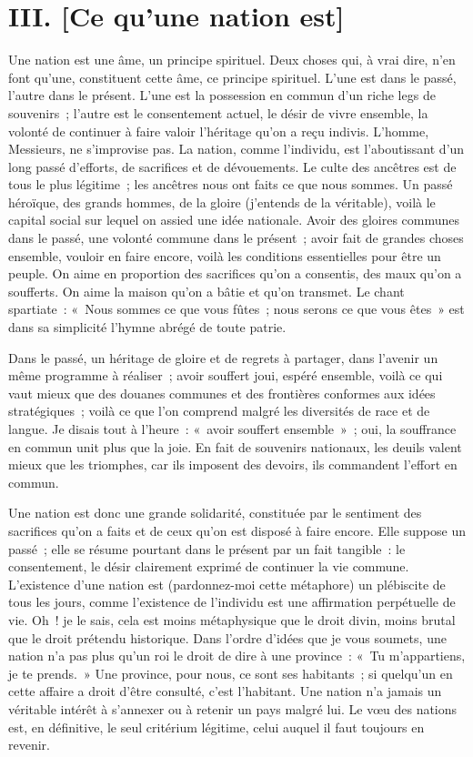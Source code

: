 \documentclass[french,twoside]{book} %
\newcommand\chaptercont{} %
\begin{document}
\chapter[{III. [Ce qu’une nation est]}]{III. [Ce qu’une nation est]}
\renewcommand{\leftmark}{III. [Ce qu’une nation est]}


\chaptercont
\noindent Une nation est une âme, un principe spirituel. Deux choses qui, à vrai dire, n’en font qu’une, constituent cette âme, ce principe spirituel. L’une est dans le passé, l’autre dans le présent. L’une est la possession en commun d’un riche legs de souvenirs ; l’autre est le consentement actuel, le désir de vivre ensemble, la volonté de continuer à faire valoir l’héritage qu’on a reçu indivis. L’homme, Messieurs, ne s’improvise pas. La nation, comme l’individu, est l’aboutissant d’un long passé d’efforts, de sacrifices et de dévouements. Le culte des ancêtres est de tous le plus légitime ; les ancêtres nous ont faits ce que nous sommes. Un passé héroïque, des grands hommes, de la gloire (j’entends de la véritable), voilà le capital social sur lequel on assied une idée nationale. Avoir des gloires communes dans le passé, une volonté commune dans le présent ; avoir fait de grandes choses ensemble, vouloir en faire encore, voilà les conditions essentielles pour être un peuple. On aime en proportion des sacrifices qu’on a consentis, des maux qu’on a soufferts. On aime la maison qu’on a bâtie et qu’on transmet. Le chant spartiate : « Nous sommes ce que vous fûtes ; nous serons ce que vous êtes » est dans sa simplicité l’hymne abrégé de toute patrie.\par
Dans le passé, un héritage de gloire et de regrets à partager, dans l’avenir un même programme à réaliser ; avoir souffert joui, espéré ensemble, voilà ce qui vaut mieux que des douanes communes et des frontières conformes aux idées stratégiques ; voilà ce que l’on comprend malgré les diversités de race et de langue. Je disais tout à l’heure : « avoir souffert ensemble » ; oui, la souffrance en commun unit plus que la joie. En fait de souvenirs nationaux, les deuils valent mieux que les triomphes, car ils imposent des devoirs, ils commandent l’effort en commun.\par
Une nation est donc une grande solidarité, constituée par le sentiment des sacrifices qu’on a faits et de ceux qu’on est disposé à faire encore. Elle suppose un passé ; elle se résume pourtant dans le présent par un fait tangible : le consentement, le désir clairement exprimé de continuer la vie commune. L’existence d’une nation est (pardonnez-moi cette métaphore) un plébiscite de tous les jours, comme l’existence de l’individu est une affirmation perpétuelle de vie. Oh ! je le sais, cela est moins métaphysique que le droit divin, moins brutal que le droit prétendu historique. Dans l’ordre d’idées que je vous soumets, une nation n’a pas plus qu’un roi le droit de dire à une province : « Tu m’appartiens, je te prends. » Une province, pour nous, ce sont ses habitants ; si quelqu’un en cette affaire a droit d’être consulté, c’est l’habitant. Une nation n’a jamais un véritable intérêt à s’annexer ou à retenir un pays malgré lui. Le vœu des nations est, en définitive, le seul critérium légitime, celui auquel il faut toujours en revenir.\par
\end{document}
